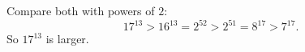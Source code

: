 Compare both with powers of $2$:
\[17^{13}>16^{13}=2^{52}>2^{51}=8^{17}>7^{17}.\]
So $\boxed{17^{13}}$ is larger.
